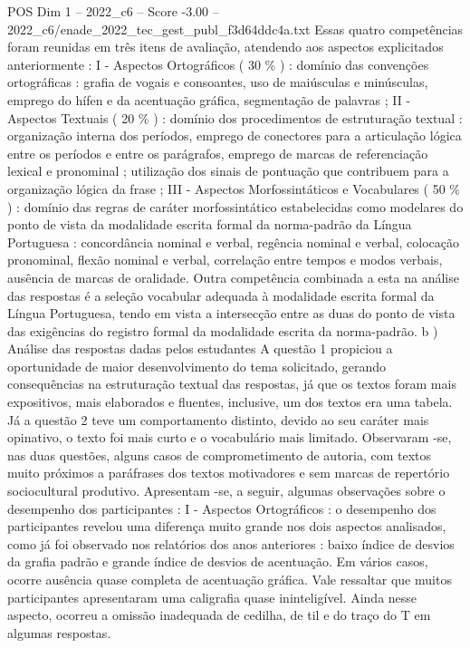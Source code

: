 \begin{textsample}{POS Dim 1 – 2022\_c6 – Score -3.00 – 2022\_c6/enade\_2022\_tec\_gest\_publ\_f3d64ddc4a.txt}
Essas quatro competências foram reunidas em três itens de avaliação, atendendo aos aspectos explicitados anteriormente : I - Aspectos Ortográficos ( 30 \% ) : domínio das convenções ortográficas : grafia de vogais e consoantes, uso de maiúsculas e minúsculas, emprego do hífen e da acentuação gráfica, segmentação de palavras ; II - Aspectos Textuais ( 20 \% ) : domínio dos procedimentos de estruturação textual : organização interna dos períodos, emprego de conectores para a articulação lógica entre os períodos e entre os parágrafos, emprego de marcas de referenciação lexical e pronominal ; utilização dos sinais de pontuação que contribuem para a organização lógica da frase ; III - Aspectos Morfossintáticos e Vocabulares ( 50 \% ) : domínio das regras de caráter morfossintático estabelecidas como modelares do ponto de vista da modalidade escrita formal da norma-padrão da Língua Portuguesa : concordância nominal e verbal, regência nominal e verbal, colocação pronominal, flexão nominal e verbal, correlação entre tempos e modos verbais, ausência de marcas de oralidade.
Outra competência combinada a esta na análise das respostas é a seleção vocabular adequada à modalidade escrita formal da Língua Portuguesa, tendo em vista a intersecção entre as duas do ponto de vista das exigências do registro formal da modalidade escrita da norma-padrão. b ) Análise das respostas dadas pelos estudantes A questão 1 propiciou a oportunidade de maior desenvolvimento do tema solicitado, gerando consequências na estruturação textual das respostas, já que os textos foram mais expositivos, mais elaborados e fluentes, inclusive, um dos textos era uma tabela.
Já a questão 2 teve um comportamento distinto, devido ao seu caráter mais opinativo, o texto foi mais curto e o vocabulário mais limitado.
Observaram -se, nas duas questões, alguns casos de comprometimento de autoria, com textos muito próximos a paráfrases dos textos motivadores e sem marcas de repertório sociocultural produtivo.
Apresentam -se, a seguir, algumas observações sobre o desempenho dos participantes : I - Aspectos Ortográficos : o desempenho dos participantes revelou uma diferença muito grande nos dois aspectos analisados, como já foi observado nos relatórios dos anos anteriores : baixo índice de desvios da grafia padrão e grande índice de desvios de acentuação.
Em vários casos, ocorre ausência quase completa de acentuação gráfica.
Vale ressaltar que muitos participantes apresentaram uma caligrafia quase ininteligível.
Ainda nesse aspecto, ocorreu a omissão inadequada de cedilha, de til e do traço do T em algumas respostas.

\end{textsample}
